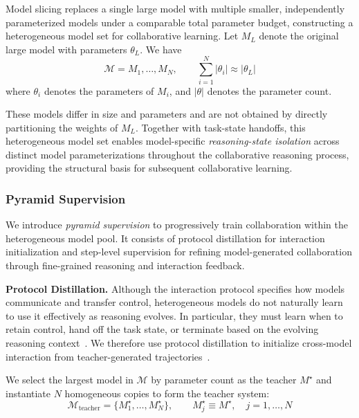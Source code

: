 \documentclass{article} %
\begin{document}
Model slicing replaces a single large model with multiple smaller, independently parameterized models under a comparable total parameter budget, constructing a heterogeneous model set for collaborative learning. Let $M_L$ denote the original large model with parameters $\theta_L$. We have
\vspace{-0.3em}
\begin{equation}
\mathcal{M} = {M_1, \ldots, M_N},
\qquad \sum_{i=1}^{N} |\theta_i| \approx |\theta_L|
\end{equation}
\vspace{-0.1em}
where $\theta_i$ denotes the parameters of $M_i$, and $|\theta|$ denotes the parameter count.

These models differ in size and parameters and are not obtained by directly partitioning the weights of $M_L$. Together with task-state handoffs, this heterogeneous model set enables model-specific \textit{reasoning-state isolation} across distinct model parameterizations throughout the collaborative reasoning process, providing the structural basis for subsequent collaborative learning.


\subsubsection{Pyramid Supervision}
\label{sec:Pyramid_Supervision}

We introduce \textit{pyramid supervision} to progressively train collaboration within the heterogeneous model pool. It consists of protocol distillation for interaction initialization and step-level supervision for refining model-generated collaboration through fine-grained reasoning and interaction feedback.

\noindent\textbf{Protocol Distillation.}\quad
Although the interaction protocol specifies how models communicate and transfer control, heterogeneous models do not naturally learn to use it effectively as reasoning evolves. In particular, they must learn when to retain control, hand off the task state, or terminate based on the evolving reasoning context~\citep{zeng2024agenttuning}. We therefore use protocol distillation to initialize cross-model interaction from teacher-generated trajectories~\citep{chen2024magdi}.

We select the largest model in $\mathcal{M}$ by parameter count as the teacher $M^\star$ and instantiate $N$ homogeneous copies to form the teacher system:
\begin{equation}
    \mathcal{M}_{\mathrm{teacher}}
    =
    \{M_1^\star,\ldots,M_N^\star\},
    \qquad
    M_j^\star \equiv M^\star,\quad j=1,\ldots,N
\end{equation}
\end{document}
